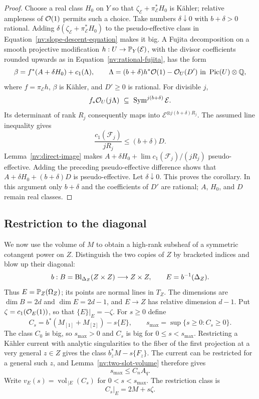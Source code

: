 \begin{proof}
Choose a real class \(H_0\) on \(Y\) so that
\(\zeta_{\mathscr E}+\pi_{\mathscr E}^*H_0\) is Kähler; relative
ampleness of \(\mathcal O(1)\) permits such a choice.  Take numbers
\(\delta\downarrow0\) with \(b+\delta>0\) rational.  Adding
\(\delta(\zeta_{\mathscr E}+\pi_{\mathscr E}^*H_0)\) to the
pseudo-effective class in Equation~\eqref{nv:slope-descent-equation} makes it
big.  A Fujita decomposition on a smooth projective modification
\(h:U\to\mathbb P_Y(\mathcal{E})\), with the divisor coefficients rounded
upwards as in Equation~\eqref{nv:rational-fujita}, has the form
\[
 \beta=f^*(A+\delta H_0)+c_1(\Lambda),\qquad
 \Lambda=(b+\delta)h^*\mathcal O(1)-\mathcal O_U(D')
       \ \text{in }\operatorname{Pic}(U)\otimes\mathbb Q,
\]
where \(f=\pi_{\mathscr E}h\), \(\beta\) is Kähler, and \(D'\ge0\)
is rational.  For divisible \(j\),
\[
 f_*\mathcal O_U(j\Lambda)\ \subseteq\
           \operatorname{Sym}^{j(b+\delta)}\mathcal{E} .
\]
Its determinant of rank \(R_j\) consequently maps into
\(\mathscr E^{\otimes j(b+\delta)R_j}\).  The assumed line inequality
gives
\[
 \frac{c_1(\mathcal F_j)}{jR_j}\le(b+\delta)D.
\]
Lemma~\ref{nv:direct-image} makes
\(A+\delta H_0+\lim c_1(\mathcal F_j)/(jR_j)\) pseudo-effective.
Adding the preceding pseudo-effective difference shows that
\(A+\delta H_0+(b+\delta)D\) is pseudo-effective.  Let
\(\delta\downarrow0\).  This proves the corollary.  In this argument
only \(b+\delta\) and the coefficients of \(D'\) are rational; \(A\),
\(H_0\), and \(D\) remain real classes.
\end{proof}

\subsection{Restriction to the diagonal}

We now use the volume of \(M\) to obtain a high-rank subsheaf of a
symmetric cotangent power on \(Z\).  Distinguish the two copies of \(Z\)
by bracketed indices and
blow up their diagonal:
\[
 b:B=\operatorname{Bl}_{\Delta_Z}(Z\times Z)\longrightarrow Z\times Z,\qquad
 E=b^{-1}(\Delta_Z).
\]
Thus \(E=\mathbb P_Z(\Omega_Z)\); its points are normal lines in \(T_Z\).
The dimensions are \(\dim B=2d\) and \(\dim E=2d-1\), and
\(E\to Z\) has relative dimension \(d-1\).
Put \(\zeta=c_1(\mathcal O_E(1))\), so that \(\{E\}|_E=-\zeta\).
For \(s\ge0\) define
\[
 C_s=b^*(M_{[1]}+M_{[2]})-s\{E\},\qquad
 s_{\max}=\sup\{s\ge0:C_s\ge0\}.
\]
The class \(C_0\) is big, so \(s_{\max}>0\) and \(C_s\) is big for
\(0\le s<s_{\max}\).  Restricting a Kähler current with analytic
singularities to the fiber of the first projection at a very general
\(z\in Z\) gives the class \(b_z^*M-s\{F_z\}\).  The current can be
restricted for a general such \(z\), and Lemma~\ref{nv:two-slot-volume}
therefore gives
\begin{equation}\label{nv:smax}
 s_{\max}\le C_nA_q .
\end{equation}
Write \(v_E(s)=\operatorname{vol}_{\,|E}(C_s)\) for
\(0<s<s_{\max}\).  The restriction class is
\begin{equation}\label{nv:restriction-class}
 C_s|_E=2M+s\zeta .
\end{equation}

